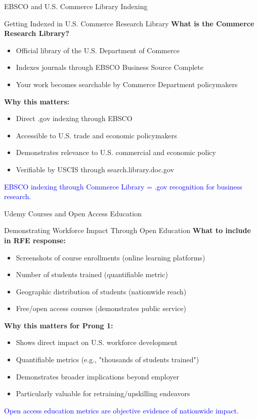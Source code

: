 \documentclass[11pt]{beamer}
\begin{document}
	\begin{frame}{EBSCO and U.S. Commerce Library Indexing}
		\scriptsize
		\begin{block}{Getting Indexed in U.S. Commerce Research Library}
			\textbf{What is the Commerce Research Library?}
			\begin{itemize}
				\item Official library of the U.S. Department of Commerce
				\item Indexes journals through EBSCO Business Source Complete
				\item Your work becomes searchable by Commerce Department policymakers
			\end{itemize}
			\textbf{Why this matters:}
			\begin{itemize}
				\item Direct .gov indexing through EBSCO
				\item Accessible to U.S. trade and economic policymakers
				\item Demonstrates relevance to U.S. commercial and economic policy
				\item Verifiable by USCIS through search.library.doc.gov
			\end{itemize}
			\textcolor{blue}{EBSCO indexing through Commerce Library = .gov recognition for business research.}
		\end{block}
	\end{frame}
	
	
	\begin{frame}{Udemy Courses and Open Access Education}
		\scriptsize
		\begin{block}{Demonstrating Workforce Impact Through Open Education}
			\textbf{What to include in RFE response:}
			\begin{itemize}
				\item Screenshots of course enrollments (online learning platforms)
				\item Number of students trained (quantifiable metric)
				\item Geographic distribution of students (nationwide reach)
				\item Free/open access courses (demonstrates public service)
			\end{itemize}
			\textbf{Why this matters for Prong 1:}
			\begin{itemize}
				\item Shows direct impact on U.S. workforce development
				\item Quantifiable metrics (e.g., "thousands of students trained")
				\item Demonstrates broader implications beyond employer
				\item Particularly valuable for retraining/upskilling endeavors
			\end{itemize}
			\textcolor{blue}{Open access education metrics are objective evidence of nationwide impact.}
		\end{block}
	\end{frame}
	
\end{document}
